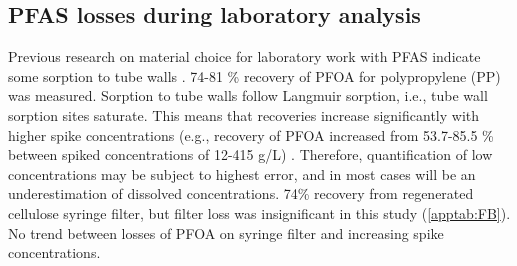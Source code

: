 \subsection{PFAS losses during laboratory analysis \label{sec:losses}}
Previous research on material choice for laboratory work with PFAS indicate some sorption to tube walls \citep{Lath2019labsorb}. 74-81 \% recovery of PFOA for polypropylene (PP) was measured. Sorption to tube walls follow Langmuir sorption, i.e., tube wall sorption sites saturate. This means that recoveries increase significantly with higher spike concentrations (e.g., recovery of PFOA increased from 53.7-85.5 \% between spiked concentrations of 12-415 \textmu g/L) \citep{Lath2019labsorb}. Therefore, quantification of low concentrations may be subject to highest error, and in most cases will be an underestimation of dissolved concentrations. 74\% recovery from regenerated cellulose syringe filter, but filter loss was insignificant in this study (\cref{apptab:FB}). No trend between losses of PFOA on syringe filter and increasing spike concentrations. 